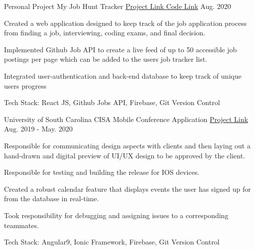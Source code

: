 
\begin{cventries}

    
     \cventry
    {Personal Project} %
    {{My Job Hunt Tracker}} %
    {\href{https://react-jobsearchapp.web.app/}{Project Link } \href{https://github.com/zmiguel2016/jobSearchApp}{ Code Link}} %
    { Aug. 2020} %
    {
      \begin{cvitems} %
        \item {Created a web application designed to keep track of the job application process from finding a job, interviewing, coding exams, and final decision.}
        \item {Implemented Github Job API to create a live feed of up to 50 accessible job postings per page which can be added to the users job tracker list.}
        \item {Integrated user-authentication and back-end database to keep track of unique users progress}
        \item {Tech Stack: React JS, Github Jobs API, Firebase, Git Version Control }
      \end{cvitems}
    }

    \cventry
    {University of South Carolina} %
    {{CISA Mobile Conference Application}} %
    {\href{https://sccapstone.github.io/TheClimateCrew/index}{Project Link}} %
    {Aug. 2019 - May. 2020} %
    {
      \begin{cvitems} %
        \item {Responsible for communicating design aspects with clients and then laying out a hand-drawn and digital preview of UI/UX design to be approved by  the client.}
        \item {Responsible for testing and building the release for IOS devices.}
        \item {Created a robust calendar feature that displays events the user has signed up for from the database in real-time.}
        \item {Took responsibility for debugging and assigning issues to a corresponding teammates.}
        \item {Tech Stack: Angular9, Ionic Framework, Firebase, Git Version Control }
      \end{cvitems}
    }


\end{cventries}
